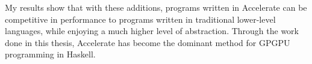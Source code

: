 My results show that with these additions, programs written in Accelerate can be
competitive in performance to programs written in traditional lower-level
languages, while enjoying a much higher level of abstraction. Through the work
done in this thesis, Accelerate has become the dominant method for GPGPU\gpgpu{}
programming in Haskell.


%
%
%


